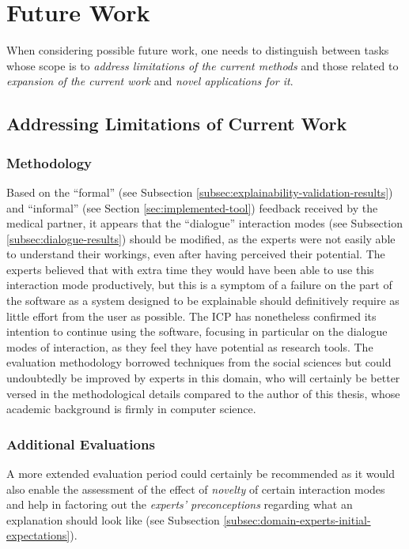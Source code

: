 \section{Future Work} \label{sec:future-work}
When considering possible future work, one needs to distinguish between tasks whose scope is to \textit{address limitations of the current methods} and those related to \textit{expansion of the current work} and \textit{novel applications for it}.

\subsection{Addressing Limitations of Current Work}
\subsubsection{Methodology}
Based on the \enquote{formal} (see Subsection \ref{subsec:explainability-validation-results}) and \enquote{informal} (see Section \ref{sec:implemented-tool}) feedback received by the medical partner, it appears that the \enquote{dialogue} interaction modes (see Subsection \ref{subsec:dialogue-results}) should be modified, as the experts were not easily able to understand their workings, even after having perceived their potential.
The experts believed that with extra time they would have been able to use this interaction mode productively, but this is a symptom of a failure on the part of the software as a system designed to be explainable should definitively require as little effort from the user as possible.
The ICP has nonetheless confirmed its intention to continue using the software, focusing in particular on the dialogue modes of interaction, as they feel they have potential as research tools.
The evaluation methodology borrowed techniques from the social sciences but could undoubtedly be improved by experts in this domain, who will certainly be better versed in the methodological details compared to the author of this thesis, whose academic background is firmly in computer science.

\subsubsection{Additional Evaluations}
A more extended evaluation period could certainly be recommended as it would also enable the assessment of the effect of \textit{novelty} of certain interaction modes and help in factoring out the \textit{experts' preconceptions} regarding what an explanation should look like (see Subsection \ref{subsec:domain-experts-initial-expectations}).

